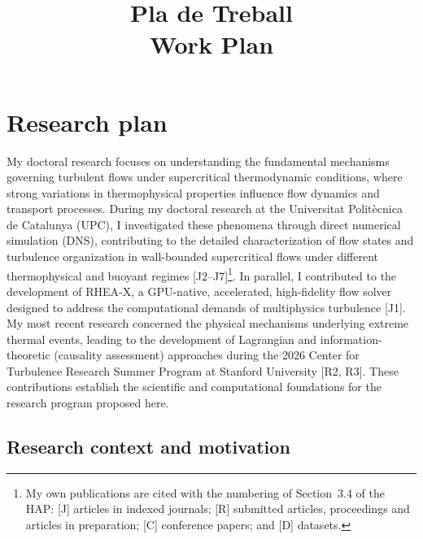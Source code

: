 \documentclass[11pt]{article}
\title{\textbf{Pla de Treball}\\[2pt]\large Work Plan}
\author{\Large \CandName}
\date{}
\begin{document}
\maketitle
\thispagestyle{plain}
\vspace{0.5cm}
\begin{center}\postdata\end{center}

\newpage
\tableofcontents

\section{Research plan}\label{sec:research}

My doctoral research focuses on understanding the fundamental mechanisms governing turbulent flows under supercritical thermodynamic conditions, where strong variations in thermophysical properties influence flow dynamics and transport processes.
During my doctoral research at the Universitat Politècnica de Catalunya (UPC), I investigated these phenomena through direct numerical simulation (DNS), contributing to the detailed characterization of flow states and turbulence organization in wall-bounded supercritical flows under different thermophysical and buoyant regimes [J2--J7]\footnote{My own publications are cited with the numbering of Section~3.4 of the HAP: [J] articles in indexed journals; [R] submitted articles, proceedings and articles in preparation; [C] conference papers; and [D] datasets.}.
In parallel, I contributed to the development of RHEA-X, a GPU-native, accelerated, high-fidelity flow solver designed to address the computational demands of multiphysics turbulence [J1].
My most recent research concerned the physical mechanisms underlying extreme thermal events, leading to the development of Lagrangian and information-theoretic (causality assessment) approaches during the 2026 Center for Turbulence Research Summer Program at Stanford University [R2, R3].
These contributions establish the scientific and computational foundations for the research program proposed here.

\subsection{Research context and motivation}\label{sec:background}
\end{document}
